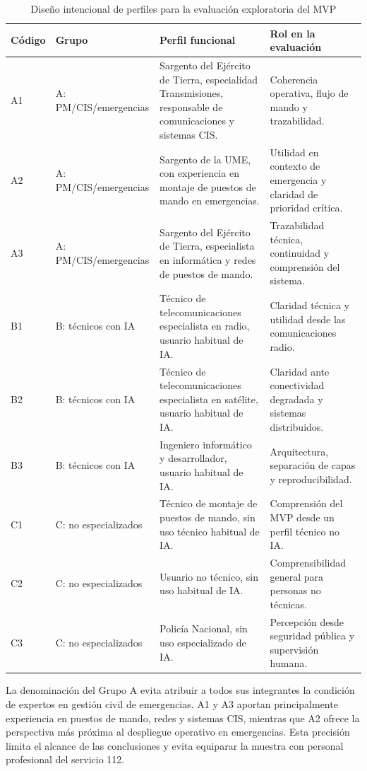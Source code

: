 \begin{table}[ht]
\centering
\caption{Diseño intencional de perfiles para la evaluación exploratoria del MVP}
\label{tab:anexod-participantes}
\scriptsize
\begin{tabularx}{\textwidth}{|p{0.9cm}|p{3.2cm}|X|p{3.9cm}|}
\hline
\textbf{Código} & \textbf{Grupo} & \textbf{Perfil funcional} & \textbf{Rol en la evaluación} \\ \hline
A1 & A: PM/CIS/emergencias & Sargento del Ejército de Tierra, especialidad Transmisiones, responsable de comunicaciones y sistemas CIS. & Coherencia operativa, flujo de mando y trazabilidad. \\ \hline
A2 & A: PM/CIS/emergencias & Sargento de la UME, con experiencia en montaje de puestos de mando en emergencias. & Utilidad en contexto de emergencia y claridad de prioridad crítica. \\ \hline
A3 & A: PM/CIS/emergencias & Sargento del Ejército de Tierra, especialista en informática y redes de puestos de mando. & Trazabilidad técnica, continuidad y comprensión del sistema. \\ \hline
B1 & B: técnicos con IA & Técnico de telecomunicaciones especialista en radio, usuario habitual de IA. & Claridad técnica y utilidad desde las comunicaciones radio. \\ \hline
B2 & B: técnicos con IA & Técnico de telecomunicaciones especialista en satélite, usuario habitual de IA. & Claridad ante conectividad degradada y sistemas distribuidos. \\ \hline
B3 & B: técnicos con IA & Ingeniero informático y desarrollador, usuario habitual de IA. & Arquitectura, separación de capas y reproducibilidad. \\ \hline
C1 & C: no especializados & Técnico de montaje de puestos de mando, sin uso técnico habitual de IA. & Comprensión del MVP desde un perfil técnico no IA. \\ \hline
C2 & C: no especializados & Usuario no técnico, sin uso habitual de IA. & Comprensibilidad general para personas no técnicas. \\ \hline
C3 & C: no especializados & Policía Nacional, sin uso especializado de IA. & Percepción desde seguridad pública y supervisión humana. \\ \hline
\end{tabularx}
\end{table}

La denominación del Grupo A evita atribuir a todos sus integrantes la condición de
expertos en gestión civil de emergencias. A1 y A3 aportan principalmente experiencia en
puestos de mando, redes y sistemas CIS, mientras que A2 ofrece la perspectiva más próxima
al despliegue operativo en emergencias. Esta precisión limita el alcance de las
conclusiones y evita equiparar la muestra con personal profesional del servicio 112.

